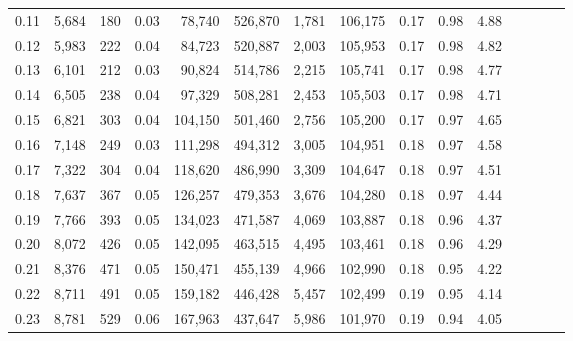\begin{tabular}{rrrcrrrrrrrrrrr}
0.11 &   5,684 &    180 &                                       0.03 &   78,740 &  526,870 &    1,781 &  106,175 &  0.17 &  0.98 &                         4.88 \\
0.12 &   5,983 &    222 &                                       0.04 &   84,723 &  520,887 &    2,003 &  105,953 &  0.17 &  0.98 &                         4.82 \\
0.13 &   6,101 &    212 &                                       0.03 &   90,824 &  514,786 &    2,215 &  105,741 &  0.17 &  0.98 &                         4.77 \\
0.14 &   6,505 &    238 &                                       0.04 &   97,329 &  508,281 &    2,453 &  105,503 &  0.17 &  0.98 &                         4.71 \\
0.15 &   6,821 &    303 &                                       0.04 &  104,150 &  501,460 &    2,756 &  105,200 &  0.17 &  0.97 &                         4.65 \\
0.16 &   7,148 &    249 &                                       0.03 &  111,298 &  494,312 &    3,005 &  104,951 &  0.18 &  0.97 &                         4.58 \\
0.17 &   7,322 &    304 &                                       0.04 &  118,620 &  486,990 &    3,309 &  104,647 &  0.18 &  0.97 &                         4.51 \\
0.18 &   7,637 &    367 &                                       0.05 &  126,257 &  479,353 &    3,676 &  104,280 &  0.18 &  0.97 &                         4.44 \\
0.19 &   7,766 &    393 &                                       0.05 &  134,023 &  471,587 &    4,069 &  103,887 &  0.18 &  0.96 &                         4.37 \\
0.20 &   8,072 &    426 &                                       0.05 &  142,095 &  463,515 &    4,495 &  103,461 &  0.18 &  0.96 &                         4.29 \\
0.21 &   8,376 &    471 &                                       0.05 &  150,471 &  455,139 &    4,966 &  102,990 &  0.18 &  0.95 &                         4.22 \\
0.22 &   8,711 &    491 &                                       0.05 &  159,182 &  446,428 &    5,457 &  102,499 &  0.19 &  0.95 &                         4.14 \\
0.23 &   8,781 &    529 &                                       0.06 &  167,963 &  437,647 &    5,986 &  101,970 &  0.19 &  0.94 &                         4.05 \\

\end{tabular}
